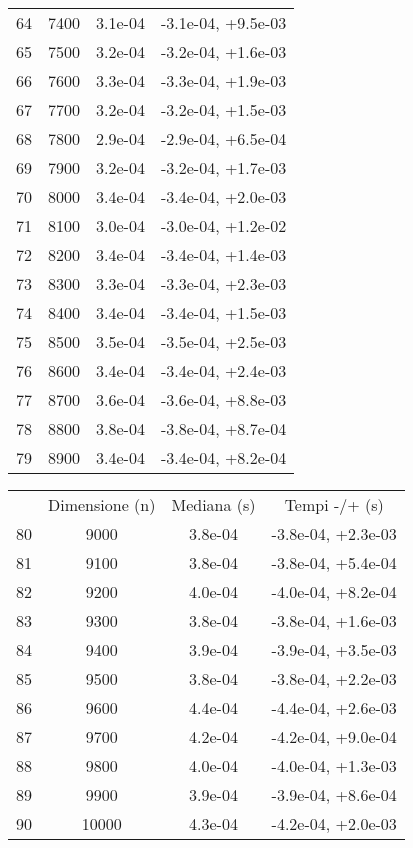 \begin{table}
\begin{adjustbox}{width=1\textwidth/2}
\begin{tabular}{|c|c|c|c|}
\cline{1-4}
64 & 7400 & 3.1e-04 & -3.1e-04, +9.5e-03 \\
\cline{1-4}
65 & 7500 & 3.2e-04 & -3.2e-04, +1.6e-03 \\
\cline{1-4}
66 & 7600 & 3.3e-04 & -3.3e-04, +1.9e-03 \\
\cline{1-4}
67 & 7700 & 3.2e-04 & -3.2e-04, +1.5e-03 \\
\cline{1-4}
68 & 7800 & 2.9e-04 & -2.9e-04, +6.5e-04 \\
\cline{1-4}
69 & 7900 & 3.2e-04 & -3.2e-04, +1.7e-03 \\
\cline{1-4}
70 & 8000 & 3.4e-04 & -3.4e-04, +2.0e-03 \\
\cline{1-4}
71 & 8100 & 3.0e-04 & -3.0e-04, +1.2e-02 \\
\cline{1-4}
72 & 8200 & 3.4e-04 & -3.4e-04, +1.4e-03 \\
\cline{1-4}
73 & 8300 & 3.3e-04 & -3.3e-04, +2.3e-03 \\
\cline{1-4}
74 & 8400 & 3.4e-04 & -3.4e-04, +1.5e-03 \\
\cline{1-4}
75 & 8500 & 3.5e-04 & -3.5e-04, +2.5e-03 \\
\cline{1-4}
76 & 8600 & 3.4e-04 & -3.4e-04, +2.4e-03 \\
\cline{1-4}
77 & 8700 & 3.6e-04 & -3.6e-04, +8.8e-03 \\
\cline{1-4}
78 & 8800 & 3.8e-04 & -3.8e-04, +8.7e-04 \\
\cline{1-4}
79 & 8900 & 3.4e-04 & -3.4e-04, +8.2e-04 \\
\cline{1-4}
\end{tabular}
\end{adjustbox}
\end{table}

\begin{table}
\centering
\begin{adjustbox}{width=1\textwidth/2}
\begin{tabular}{|c|c|c|c|}
\hline
 & Dimensione (n) & Mediana (s) & Tempi -/+ (s) \\
80 & 9000 & 3.8e-04 & -3.8e-04, +2.3e-03 \\
\cline{1-4}
81 & 9100 & 3.8e-04 & -3.8e-04, +5.4e-04 \\
\cline{1-4}
82 & 9200 & 4.0e-04 & -4.0e-04, +8.2e-04 \\
\cline{1-4}
83 & 9300 & 3.8e-04 & -3.8e-04, +1.6e-03 \\
\cline{1-4}
84 & 9400 & 3.9e-04 & -3.9e-04, +3.5e-03 \\
\cline{1-4}
85 & 9500 & 3.8e-04 & -3.8e-04, +2.2e-03 \\
\cline{1-4}
86 & 9600 & 4.4e-04 & -4.4e-04, +2.6e-03 \\
\cline{1-4}
87 & 9700 & 4.2e-04 & -4.2e-04, +9.0e-04 \\
\cline{1-4}
88 & 9800 & 4.0e-04 & -4.0e-04, +1.3e-03 \\
\cline{1-4}
89 & 9900 & 3.9e-04 & -3.9e-04, +8.6e-04 \\
\cline{1-4}
90 & 10000 & 4.3e-04 & -4.2e-04, +2.0e-03 \\
\cline{1-4}
\end{tabular}
\end{adjustbox}
\end{table}
